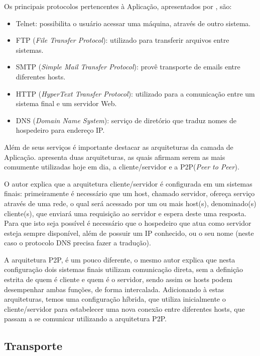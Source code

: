 Os principais protocolos pertencentes à Aplicação, apresentados por \cite{STALLINGS}, são:
\begin{itemize}
\item Telnet: possibilita o usu\'ario acessar uma m\'aquina, atrav\'es de outro sistema.
\item FTP (\textit{File Transfer Protocol}): utilizado para transferir arquivos entre sistemas.
\item SMTP (\textit{Simple Mail Transfer Protocol}): prov\^e transporte de emails entre diferentes hosts.
\item HTTP (\textit{HyperText Transfer Protocol}): utilizado para a comunicação entre um sistema final e um servidor Web.
\item DNS (\textit{Domain Name System}): serviço de diretório que traduz nomes de hospedeiro para endereço IP.
\end{itemize}

Além de seus serviços é importante destacar as arquiteturas da camada de Aplicação.  apresenta duas arquiteturas, as quais afirmam serem as mais comumente utilizadas hoje em dia, a cliente/servidor e a P2P(\textit{Peer to Peer}).

O autor explica que a arquitetura cliente/servidor é configurada em um sistemas finais: primeiramente é necessário que um host, chamado servidor, ofereça serviço através de uma rede, o qual será acessado por um ou mais host(s), denominado(s) cliente(s), que enviará uma requisição ao servidor e espera deste uma resposta. Para que isto seja poss\'ivel \'e necess\'ario que o hospedeiro que atua como servidor esteja sempre disponível, além de possuir um IP conhecido, ou o seu nome (neste caso o protocolo DNS precisa fazer a traduç\~ao).

A arquitetura P2P, é um pouco diferente, o mesmo autor explica que nesta configuração dois sistemas finais utilizam comunicação direta, sem a definição estrita de quem é cliente e quem é o servidor, sendo assim os hosts podem desempenhar ambas funções, de forma intercalada. Adicionando à estas arquiteturas, temos uma configuração híbrida, que utiliza inicialmente o cliente/servidor para estabelecer uma nova conexão entre diferentes hosts, que passam a se comunicar utilizando a arquitetura P2P.

\subsection{Transporte}

